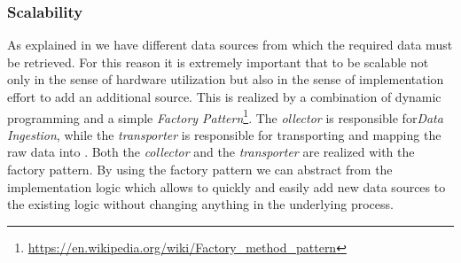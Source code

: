 \subsubsection{Scalability}
\label{subsubsec:scale}
As explained in  we have different data sources from which the required data must be retrieved.
For this reason it is extremely important that to be  scalable not only in the sense of hardware utilization but also in the sense of implementation effort to add an additional source.
\newline
This is realized by a combination of dynamic programming and a simple \textit{Factory Pattern}\footnote{\url{https://en.wikipedia.org/wiki/Factory_method_pattern}}.%
\newline
The \textit{ollector} is responsible for\textit{Data Ingestion}, while the \textit{transporter} is responsible for transporting and mapping the raw data into \pg{}. Both the \textit{collector} and the \textit{transporter} are realized with the factory pattern. By using the factory pattern we can abstract from the implementation logic which allows to quickly and easily add new data sources to the existing logic without changing anything in the underlying process.
%
